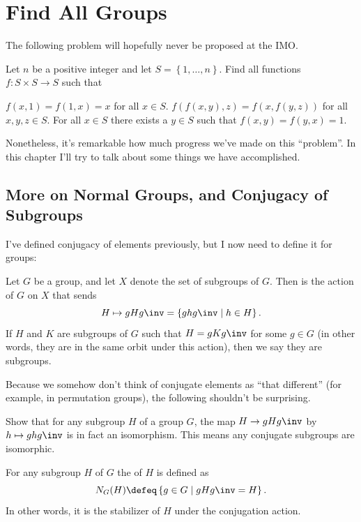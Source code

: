 \chapter{Find All Groups}
The following problem will hopefully never be proposed at the IMO.
\begin{problem*}
	Let $n$ be a positive integer and let $S = \left\{ 1,\dots,n \right\}$.
	Find all functions $f : S \times S \to S$ such that
	\begin{enumerate}[(a)]
		\ii $f(x,1)=f(1,x)=x$ for all $x \in S$.
		\ii $f(f(x,y),z)=f(x,f(y,z))$ for all $x,y,z \in S$.
		\ii For all $x \in S$ there exists a $y \in S$ such that $f(x,y)=f(y,x)=1$.
	\end{enumerate}
\end{problem*}
Nonetheless, it's remarkable how much progress we've made on this ``problem''.
In this chapter I'll try to talk about some things we have accomplished.

\section{More on Normal Groups, and Conjugacy of Subgroups}

I've defined conjugacy of elements previously, but I now need to define
it for groups:
\begin{definition}
	Let $G$ be a group, and let $X$ denote the set of subgroups of $G$.
	Then  is the action of $G$ on $X$ that sends
	\[ H \mapsto gHg\inv = \left\{ ghg\inv \mid h \in H \right\}. \]
	If $H$ and $K$ are subgroups of $G$ such that $H = gKg\inv$ for some $g \in G$
	(in other words, they are in the same orbit under this action),
	then we say they are  subgroups.
\end{definition}

Because we somehow don't think of conjugate elements as ``that different'' (for example,
in permutation groups), the following shouldn't be surprising.
\begin{ques}
	Show that for any subgroup $H$ of a group $G$, the map $H \to gHg\inv$ by
	$h \mapsto ghg\inv$ is in fact an isomorphism.
	This means any conjugate subgroups are isomorphic.
\end{ques}

\begin{definition}
	For any subgroup $H$ of $G$ the  of $H$ is defined as
	\[ N_G(H) \defeq \left\{ g \in G \mid gHg\inv = H \right\}. \]
	In other words, it is the stabilizer of $H$ under the conjugation action.
\end{definition}

